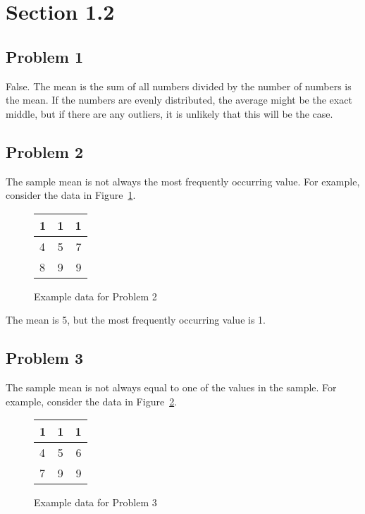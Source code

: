 \documentclass[11pt]{article}
\begin{document}
\section*{Section 1.2}
\subsection*{Problem 1}
False. The mean is the sum of all numbers divided by the number of numbers is
the mean. If the numbers are evenly distributed, the average might be the exact
middle, but if there are any outliers, it is unlikely that this will be the
case.

\subsection*{Problem 2}
The sample mean is not always the most frequently occurring value. For example,
consider the data in Figure~\ref{fig:example1}.

\begin{figure}[h]
    \centering
    \begin{tabular}{|l|c|r|} %
        \hline %
        1 & 1 & 1 \\
        \hline %
        4 & 5 & 7 \\
        \hline %
        8 & 9 & 9 \\
        \hline %
    \end{tabular}
    \caption{Example data for Problem 2}
\label{fig:example1}
\end{figure}


The mean is 5, but the most frequently occurring value is 1.

\subsection*{Problem 3}
The sample mean is not always equal to one of the values in the sample. For
example, consider the data in Figure~\ref{fig:example2}. 

\begin{figure}[h]
    \centering
    \begin{tabular}{|l|c|r|} %
        \hline %
        1 & 1 & 1 \\
        \hline %
        4 & 5 & 6 \\
        \hline %
        7 & 9 & 9 \\
        \hline %
    \end{tabular}
    \caption{Example data for Problem 3}
\label{fig:example2}
\end{figure}
\end{document}
